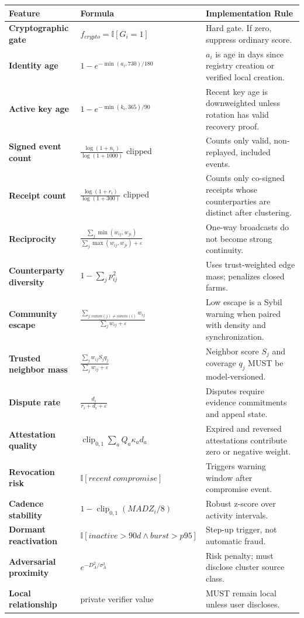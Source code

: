\documentclass[11pt]{article}
\begin{document}
\begin{longtable}{>{\bfseries}p{} p{} p{}}
\toprule
Feature & Formula & Implementation Rule \\
\midrule
Cryptographic gate & \(f_{crypto}=\mathbb{I}[G_i=1]\) & Hard gate. If zero, suppress ordinary score. \\
Identity age & \(1-e^{-\min(a_i,730)/180}\) & \(a_i\) is age in days since registry creation or verified local creation. \\
Active key age & \(1-e^{-\min(k_i,365)/90}\) & Recent key age is downweighted unless rotation has valid recovery proof. \\
Signed event count & \(\frac{\log(1+n_i)}{\log(1+1000)}\) clipped & Counts only valid, non-replayed, included events. \\
Receipt count & \(\frac{\log(1+r_i)}{\log(1+300)}\) clipped & Counts only co-signed receipts whose counterparties are distinct after clustering. \\
Reciprocity & \(\frac{\sum_j \min(w_{ij},w_{ji})}{\sum_j \max(w_{ij},w_{ji})+\varepsilon}\) & One-way broadcasts do not become strong continuity. \\
Counterparty diversity & \(1-\sum_j p_{ij}^2\) & Uses trust-weighted edge mass; penalizes closed farms. \\
Community escape & \(\frac{\sum_{j:comm(j)\neq comm(i)}w_{ij}}{\sum_jw_{ij}+\varepsilon}\) & Low escape is a Sybil warning when paired with density and synchronization. \\
Trusted neighbor mass & \(\frac{\sum_j w_{ij}S_jq_j}{\sum_j w_{ij}+\varepsilon}\) & Neighbor score \(S_j\) and coverage \(q_j\) MUST be model-versioned. \\
Dispute rate & \(\frac{d_i}{r_i+d_i+\varepsilon}\) & Disputes require evidence commitments and appeal state. \\
Attestation quality & \(\operatorname{clip}_{0,1}\sum_a Q_a\kappa_a d_a\) & Expired and reversed attestations contribute zero or negative weight. \\
Revocation risk & \(\mathbb{I}[recent\ compromise]\) & Triggers warning window after compromise event. \\
Cadence stability & \(1-\operatorname{clip}_{0,1}(MADZ_i/8)\) & Robust z-score over activity intervals. \\
Dormant reactivation & \(\mathbb{I}[inactive>90d \land burst>p95]\) & Step-up trigger, not automatic fraud. \\
Adversarial proximity & \(e^{-D_A^2/\sigma_A^2}\) & Risk penalty; must disclose cluster source class. \\
Local relationship & private verifier value & MUST remain local unless user discloses. \\
\bottomrule
\end{longtable}
\end{document}
